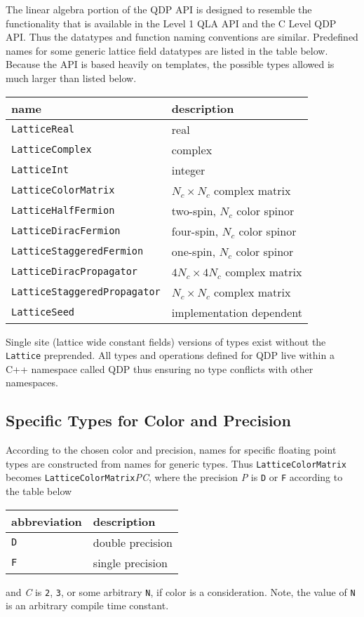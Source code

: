 \documentclass[12pt,letterpaper]{article}
\newcommand{\cpp}{C++}
\newcommand{\tLatticeReal}{LatticeReal}
\newcommand{\tLatticeComplex}{LatticeComplex}
\newcommand{\tLatticeInt}{LatticeInt}
\newcommand{\tLatticeColorMatrix}{LatticeColorMatrix}
\newcommand{\tLatticeHalfFermion}{LatticeHalfFermion}
\newcommand{\tLatticeDiracFermion}{LatticeDiracFermion}
\newcommand{\tLatticeStaggeredFermion}{LatticeStaggeredFermion}
\newcommand{\tLatticeDiracPropagator}{LatticeDiracPropagator}
\newcommand{\tLatticeStaggeredPropagator}{LatticeStaggeredPropagator}
\newcommand{\tLatticeRandomState}{LatticeSeed}
\begin{document}
The linear algebra portion of the QDP API is designed to resemble the
functionality that is available in the Level 1 QLA API and the C Level
QDP API.  Thus the datatypes and function naming conventions are
similar.  Predefined names for some generic lattice field datatypes
are listed in the table below. Because the API is based heavily on
templates, the possible types allowed is much larger than listed
below.
\begin{center}
\begin{tabular}{|l|l|}
\hline
name                       & description \\
\hline
{\tt \tLatticeReal               } & real \\
{\tt \tLatticeComplex            } & complex \\
{\tt \tLatticeInt                } & integer \\
{\tt \tLatticeColorMatrix              } & $N_c \times N_c$ complex matrix \\
{\tt \tLatticeHalfFermion        } & two-spin, $N_c$ color spinor \\
{\tt \tLatticeDiracFermion       } & four-spin, $N_c$ color spinor \\
{\tt \tLatticeStaggeredFermion   } & one-spin,  $N_c$ color spinor \\
{\tt \tLatticeDiracPropagator    } & $4N_c \times 4N_c$ complex matrix \\
{\tt \tLatticeStaggeredPropagator} & $N_c \times N_c$ complex matrix \\
{\tt \tLatticeRandomState        } & implementation dependent \\
\hline
\end{tabular}
\end{center}
%
Single site (lattice wide constant fields) versions of types exist
without the {\tt Lattice} preprended.  All types and operations
defined for QDP live within a \cpp{} namespace called QDP thus
ensuring no type conflicts with other namespaces.

\subsection{Specific Types for Color and Precision}

According to the chosen color and precision, names for specific
floating point types are constructed from names for generic types.
Thus {\tt \tLatticeColorMatrix} becomes {\tt LatticeColorMatrix}{\it PC},
where the precision {\it P} is {\tt D} or {\tt F} according to the
table below
\begin{center}
\begin{tabular}{|l|l|}
\hline
abbreviation & description \\
\hline
{\tt D}            & double precision \\
{\tt F}            & single precision \\
\hline
\end{tabular}
\end{center}
and {\it C} is {\tt 2}, {\tt 3}, or some arbitrary {\tt N}, if color is a
consideration. Note, the value of {\tt N} is an arbitrary compile
time constant.
\end{document}
